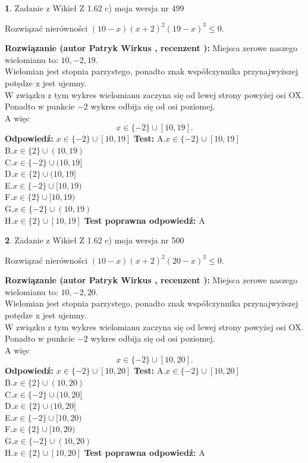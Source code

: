 \documentclass[12pt, a4paper]{article}
\theoremstyle{definition} %
\newtheorem{zad}{}
\newcommand{\zadStart}[1]{\begin{zad}#1\newline}
\newcommand{\zadStop}{\end{zad}}
\newcommand{\rozwStart}[2]{\noindent \textbf{Rozwiązanie (autor #1 , recenzent #2): }\newline}
\newcommand{\rozwStop}{\newline}
\newcommand{\odpStart}{\noindent \textbf{Odpowiedź:}\newline}
\newcommand{\odpStop}{\newline}
\newcommand{\testStart}{\noindent \textbf{Test:}\newline}
\newcommand{\testStop}{\newline}
\newcommand{\kluczStart}{\noindent \textbf{Test poprawna odpowiedź:}\newline}
\newcommand{\kluczStop}{\newline}
\begin{document}
\zadStart{Zadanie z Wikieł Z 1.62 c) moja wersja nr 499}

Rozwiązać nierówności $(10-x)(x+2)^{2}(19-x)^{3}\le0$.
\zadStop
\rozwStart{Patryk Wirkus}{}
Miejsca zerowe naszego wielomianu to: $10, -2, 19$.\\
Wielomian jest stopnia parzystego, ponadto znak współczynnika przy\linebreak najwyższej potędze x jest ujemny.\\ W związku z tym wykres wielomianu zaczyna się od lewej strony powyżej osi OX.\\
Ponadto w punkcie $-2$ wykres odbija się od osi poziomej.\\
A więc $$x \in \{-2\} \cup [10,19].$$
\rozwStop
\odpStart
$x \in \{-2\} \cup [10,19]$
\odpStop
\testStart
A.$x \in \{-2\} \cup [10,19]$\\
B.$x \in \{2\} \cup (10,19)$\\
C.$x \in \{-2\} \cup (10,19]$\\
D.$x \in \{2\} \cup (10,19]$\\
E.$x \in \{-2\} \cup [10,19)$\\
F.$x \in \{2\} \cup [10,19)$\\
G.$x \in \{-2\} \cup (10,19)$\\
H.$x \in \{2\} \cup [10,19]$
\testStop
\kluczStart
A
\kluczStop



\zadStart{Zadanie z Wikieł Z 1.62 c) moja wersja nr 500}

Rozwiązać nierówności $(10-x)(x+2)^{2}(20-x)^{3}\le0$.
\zadStop
\rozwStart{Patryk Wirkus}{}
Miejsca zerowe naszego wielomianu to: $10, -2, 20$.\\
Wielomian jest stopnia parzystego, ponadto znak współczynnika przy\linebreak najwyższej potędze x jest ujemny.\\ W związku z tym wykres wielomianu zaczyna się od lewej strony powyżej osi OX.\\
Ponadto w punkcie $-2$ wykres odbija się od osi poziomej.\\
A więc $$x \in \{-2\} \cup [10,20].$$
\rozwStop
\odpStart
$x \in \{-2\} \cup [10,20]$
\odpStop
\testStart
A.$x \in \{-2\} \cup [10,20]$\\
B.$x \in \{2\} \cup (10,20)$\\
C.$x \in \{-2\} \cup (10,20]$\\
D.$x \in \{2\} \cup (10,20]$\\
E.$x \in \{-2\} \cup [10,20)$\\
F.$x \in \{2\} \cup [10,20)$\\
G.$x \in \{-2\} \cup (10,20)$\\
H.$x \in \{2\} \cup [10,20]$
\testStop
\kluczStart
A
\kluczStop
\end{document}
